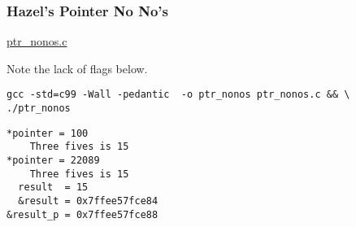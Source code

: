 \documentclass[11pt]{article}
\begin{document}
\subsubsection{Hazel's Pointer No No's}
\label{sec:org8b96fb5}

\url{ptr\_nonos.c}

Note the lack of flags below.

\begin{verbatim}
gcc -std=c99 -Wall -pedantic  -o ptr_nonos ptr_nonos.c && \
./ptr_nonos
\end{verbatim}

\begin{verbatim}
*pointer = 100
    Three fives is 15
*pointer = 22089
    Three fives is 15
  result  = 15
  &result = 0x7ffee57fce84
&result_p = 0x7ffee57fce88
\end{verbatim}
\end{document}
